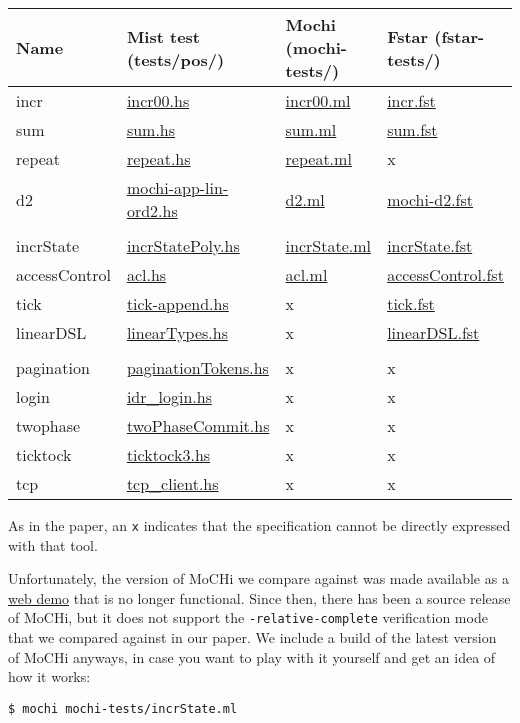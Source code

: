 \documentclass[
]{darts-v2021}
\begin{document}
\begin{longtable}[]{@{}llll@{}}
\toprule
Name & Mist test (tests/pos/) & Mochi (mochi-tests/) & Fstar
(fstar-tests/)\tabularnewline
\midrule
\endhead
incr & \href{tests/pos/incr00.hs}{incr00.hs} &
\href{mochi-tests/incr00.ml}{incr00.ml} &
\href{fstar-tests/incr.fst}{incr.fst}\tabularnewline
sum & \href{tests/pos/sum.hs}{sum.hs} &
\href{mochi-tests/sum.ml}{sum.ml} &
\href{fstar-tests/sum.fst}{sum.fst}\tabularnewline
repeat & \href{tests/pos/repeat.hs}{repeat.hs} &
\href{mochi-tests/repeat.ml}{repeat.ml} & x\tabularnewline
d2 & \href{tests/pos/mochi-app-lin-ord2.hs}{mochi-app-lin-ord2.hs} &
\href{mochi-tests/d2.ml}{d2.ml} &
\href{fstar-tests/mochi-d2.fst}{mochi-d2.fst}\tabularnewline
& & &\tabularnewline
incrState & \href{tests/pos/incrStatePoly.hs}{incrStatePoly.hs} &
\href{mochi-tests/incrState.ml}{incrState.ml} &
\href{fstar-tests/incrState.fst}{incrState.fst}\tabularnewline
accessControl & \href{tests/pos/acl.hs}{acl.hs} &
\href{mochi-tests/acl.ml}{acl.ml} &
\href{fstar-tests/accessControl.fst}{accessControl.fst}\tabularnewline
tick & \href{tests/pos/tick-append.hs}{tick-append.hs} & x &
\href{fstar-tests/tick.fst}{tick.fst}\tabularnewline
linearDSL & \href{tests/pos/linearTypes.hs}{linearTypes.hs} & x &
\href{fstar-tests/linearDSL.fst}{linearDSL.fst}\tabularnewline
& & &\tabularnewline
pagination & \href{tests/pos/paginationTokens.hs}{paginationTokens.hs} &
x & x\tabularnewline
login & \href{tests/pos/idr_login.hs}{idr\_login.hs} & x &
x\tabularnewline
twophase & \href{tests/pos/twoPhaseCommit.hs}{twoPhaseCommit.hs} & x &
x\tabularnewline
ticktock & \href{tests/pos/ticktock3.hs}{ticktock3.hs} & x &
x\tabularnewline
tcp & \href{tests/pos/tcp_client.hs}{tcp\_client.hs} & x &
x\tabularnewline
\bottomrule
\end{longtable}

As in the paper, an \texttt{x} indicates that the specification cannot
be directly expressed with that tool.

Unfortunately, the version of MoCHi we compare against was made
available as a
\href{http://www.kb.is.s.u-tokyo.ac.jp/~uhiro/relcomp/}{web demo} that
is no longer functional. Since then, there has been a source release of
MoCHi, but it does not support the \texttt{-relative-complete}
verification mode that we compared against in our paper. We include a
build of the latest version of MoCHi anyways, in case you want to play
with it yourself and get an idea of how it works:

\begin{verbatim}
$ mochi mochi-tests/incrState.ml
\end{verbatim}
\end{document}
